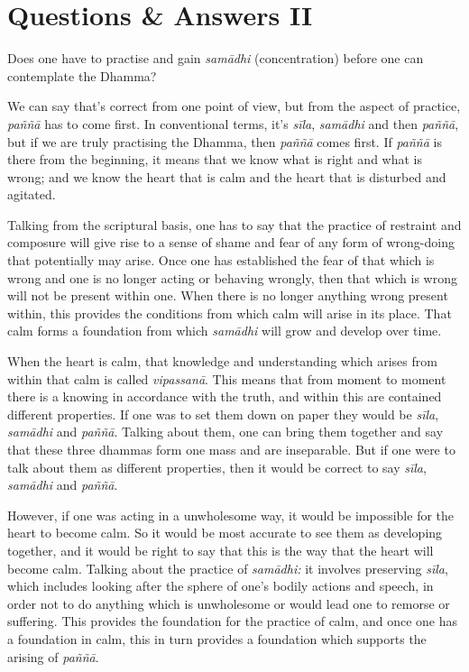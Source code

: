 
\chapter{Questions \& Answers II}

\question{}
Does one have to practise and gain \emph{samādhi} (concentration) before one
can contemplate the Dhamma?

We can say that's correct from one point of view,
but from the aspect of practice, \emph{paññā} has to come first. In
conventional terms, it's \emph{sīla}, \emph{samādhi} and then
\emph{paññā}, but if we are truly practising the Dhamma, then
\emph{paññā} comes first. If \emph{paññā} is there from the beginning, 
it means that we know what is right and what is wrong; and we know the
heart that is calm and the heart that is disturbed and agitated. 

Talking from the scriptural basis, one has to say that the practice of
restraint and composure will give rise to a sense of shame and fear of
any form of wrong-doing that potentially may arise. Once one has
established the fear of that which is wrong and one is no longer acting
or behaving wrongly, then that which is wrong will not be present within
one. When there is no longer anything wrong present within, this
provides the conditions from which calm will arise in its place. That
calm forms a foundation from which \emph{samādhi} will grow and develop over
time. 

When the heart is calm, that knowledge and understanding which arises
from within that calm is called \emph{vipassanā}. This means that from
moment to moment there is a knowing in accordance with the truth, and
within this are contained different properties. If one was to set them
down on paper they would be \emph{sīla}, \emph{samādhi} and
\emph{paññā}. Talking about them, one can bring them together and say
that these three dhammas form one mass and are inseparable. But if one
were to talk about them as different properties, then it would be
correct to say \emph{sīla}, \emph{samādhi} and \emph{paññā}. 

However, if one was acting in a unwholesome way, it would be impossible
for the heart to become calm. So it would be most accurate to see them
as developing together, and it would be right to say that this is the
way that the heart will become calm. Talking about the practice of
\emph{samādhi:} it involves preserving \emph{sīla}, which includes
looking after the sphere of one's bodily actions and speech, in order
not to do anything which is unwholesome or would lead one to remorse or
suffering. This provides the foundation for the practice of calm, and
once one has a foundation in calm, this in turn provides a foundation
which supports the arising of \emph{paññā}. 

